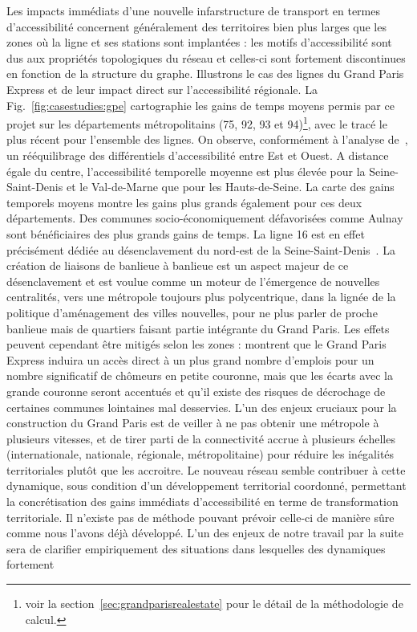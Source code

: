 Les impacts immédiats d'une nouvelle infarstructure de transport en termes d'accessibilité concernent généralement des territoires bien plus larges que les zones où la ligne et ses stations sont implantées : les motifs d'accessibilité sont dus aux propriétés topologiques du réseau et celles-ci sont fortement discontinues en fonction de la structure du graphe. Illustrons le cas des lignes du Grand Paris Express et de leur impact direct sur l'accessibilité régionale. La Fig.~\ref{fig:casestudies:gpe} cartographie les gains de temps moyens permis par ce projet sur les départements métropolitains (75, 92, 93 et 94)\footnote{voir la section~\ref{sec:grandparisrealestate} pour le détail de la méthodologie de calcul.}, avec le tracé le plus récent pour l'ensemble des lignes. On observe, conformément à l'analyse de~\cite{beaucire2013grand}, un rééquilibrage des différentiels d'accessibilité entre Est et Ouest. A distance égale du centre, l'accessibilité temporelle moyenne est plus élevée pour la Seine-Saint-Denis et le Val-de-Marne que pour les Hauts-de-Seine. La carte des gains temporels moyens montre les gains plus grands également pour ces deux départements. Des communes socio-économiquement défavorisées comme Aulnay sont bénéficiaires des plus grands gains de temps. La ligne 16 est en effet précisément dédiée au désenclavement du nord-est de la Seine-Saint-Denis~\cite{desjardins2016grand}. La création de liaisons de banlieue à banlieue est un aspect majeur de ce désenclavement et est voulue comme un moteur de l'émergence de nouvelles centralités, vers une métropole toujours plus polycentrique, dans la lignée de la politique d'aménagement des villes nouvelles, pour ne plus parler de proche banlieue mais de quartiers faisant partie intégrante du Grand Paris. Les effets peuvent cependant être mitigés selon les zones : \cite{l2013grand} montrent que le Grand Paris Express induira un accès direct à un plus grand nombre d'emplois pour un nombre significatif de chômeurs en petite couronne, mais que les écarts avec la grande couronne seront accentués et qu'il existe des risques de décrochage de certaines communes lointaines mal desservies. L'un des enjeux cruciaux pour la construction du Grand Paris est de veiller à ne pas obtenir une métropole à plusieurs vitesses, et de tirer parti de la connectivité accrue à plusieurs échelles (internationale, nationale, régionale, métropolitaine) pour réduire les inégalités territoriales plutôt que les accroitre. Le nouveau réseau semble contribuer à cette dynamique, sous condition d'un développement territorial coordonné, permettant la concrétisation des gains immédiats d'accessibilité en terme de transformation territoriale. Il n'existe pas de méthode pouvant prévoir celle-ci de manière sûre comme nous l'avons déjà développé. L'un des enjeux de notre travail par la suite sera de clarifier empiriquement des situations dans lesquelles des dynamiques fortement 